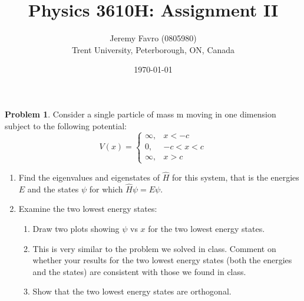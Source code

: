 \documentclass[10pt]{article}
\title{Physics 3610H: Assignment II}
\author{Jeremy Favro (0805980) \\ Trent University, Peterborough, ON, Canada}
\date{\today}
\theoremstyle{definition}
\newtheorem{problem}{Problem}
\begin{document}
\maketitle

\begin{problem} Consider a single particle of mass m moving in one dimension subject to the following
potential:
$$
  V(x)=\begin{cases}
    \infty, & x<-c   \\
    0,      & -c<x<c \\
    \infty, & x>c
  \end{cases}
$$
\begin{enumerate}[label=(\alph*)]
  \item Find the eigenvalues and eigenstates of $\hat{H}$ for this system, that is the energies $E$ and the
        states $\psi$ for which $\hat{H}\psi=E\psi$.
  \item Examine the two lowest energy states:
        \begin{enumerate}[label=(\roman*)]
          \item Draw two plots showing $\psi$ vs $x$ for the two lowest energy states.
          \item This is very similar to the problem we solved in class. Comment on whether your results
                for the two lowest energy states (both the energies and the states) are consistent with those
                we found in class.
          \item Show that the two lowest energy states are orthogonal.
        \end{enumerate}
\end{enumerate}
\end{problem}
\end{document}
